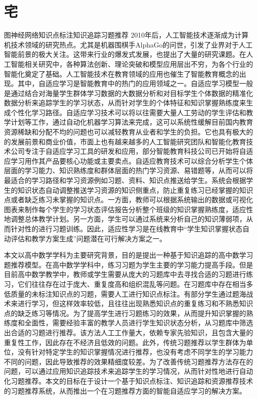 \chapter{宅}
\begin{abstractC}{图神经网络}{知识点标注}{知识追踪}{习题推荐}{}
	2010年后，人工智能技术逐渐成为计算机技术领域的研究热点。尤其是机器围棋手AlphaGo的问世，引发了业界对于人工智能前景的极大关注。这带来行业的爆发式发展，也提出了大量的研究课题。在人工智能相关研究中，各种算法创新、理论突破和模型应用层出不穷，为各个行业的智能化奠定了基础。人工智能技术在教育领域的应用也催生了智能教育概念的出现。其中，自适应学习是智能教育中的热门的应用领域之一\cite{chen2018recommendation}。自适应学习模型一般是通过结合对海量学生群体学习数据的大数据分析和对目标学生个体数据的精准化数据分析来追踪学生的学习状态，从而针对学生的个体特征和知识掌握熟练度来生成个性化学习路径\cite{soltani2019adaptive}。自适应学习技术可以将以往需要大量人工劳动的学生评估和教学计划等工作，通过自动化机器学习算法来完成，这可以系统性缓解目前国内教育资源稀缺和分配不均的问题也可以减轻教育从业者和学生的负担。它也具有极大的的发展前景和商业价值，市面上也有越来越多的人工智能研究团队和智能化教育技术公司专注于自适应学习工具的研发和应用，部分智能教育科技公司已开始将自适应学习用作其产品要核心功能或主要卖点。自适应教育技术可以综合分析学生个体层面的学习能力、知识熟练度和群体层面的热门学习资源、易错题等，从而可以将最适合的学习路径和学习资源例如习题、资料、知识点推送给学生。系统会根据学生的知识状态自动调整推送学习资源的知识侧重点，防止重复练习已经掌握的知识点或者缺乏练习未掌握的知识点。一方面，教师可以根据系统输出的数据或可视化图表来制作每个学生的学习状态评估报告分析整个班级的知识掌握熟练度，适应性地调整总体教学计划。另一方面，学生可以通过系统来分析自己的知识薄弱项，从而针对性的进行习题训练。因此，适应性学习是在线教育中``学生知识掌握状态自动评估和教学方案生成''问题潜在可行解决方案之一。

	本文以高中数学学科为主要研究背景，目的是提出一种基于知识追踪的高中数学习题推荐模型。在高中数学学科中，练习习题为学生主要的学习能力提高手段。但是目前高中数学教学中，教师或学生需要从庞大的习题库中去寻找合适的习题进行练习，它们往往存在过于庞大、重复度高和组织混乱等问题。在习题库中存在相当多低质量的未标注知识点的习题，需要人工进行知识点标注。有部分学生通过题海战术来进行学习，但这样效率较低，且往往出现熟悉知识点的重复练习和不熟悉知识点的缺乏练习等情况。为了提高学生进行习题练习的效果，从而提升知识掌握的熟练度和全面性，需要经验丰富的教学人员进行学生知识状态分析，从习题库中筛选出合适的习题进行推荐。该方法人工工作量大，依赖专家先验知识，且包含大量的重复性工作，因此存在不经济且低效的问题。此外，传统习题推荐以学生群体为单位，没有针对特定学生的知识掌握情况进行推荐，也没有考虑不同学生的学习能力不同的问题，因此导致推荐的效果精细度较差。为了改善传统习题推荐方法存在的问题，可以通过应用知识追踪技术来追踪学生的学习情况，从而针对性地进行自动化习题推荐。本文的目标在于设计一个基于知识点标注、知识追踪和资源推荐技术的习题推荐系统，从而推出一个在习题推荐方面的智能自适应学习的解决方案。


\end{abstractC}
